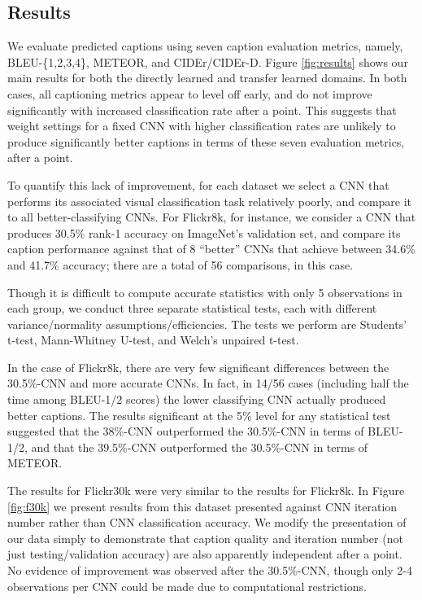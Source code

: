 \documentclass[11pt]{article}
\begin{document}
\subsection{Results}

We evaluate predicted captions using seven caption evaluation metrics,
namely, BLEU-\{1,2,3,4\}, METEOR, and CIDEr/CIDEr-D. Figure
\ref{fig:results} shows our main results for both the directly learned
and transfer learned domains. In both cases, all captioning metrics
appear to level off early, and do not improve significantly with
increased classification rate after a point. This suggests that weight
settings for a fixed CNN with higher classification rates are unlikely
to produce significantly better captions in terms of these seven
evaluation metrics, after a point.

To quantify this lack of improvement, for each dataset we select a CNN
that performs its associated visual classification task relatively
poorly, and compare it to all better-classifying CNNs. For Flickr8k,
for instance, we consider a CNN that produces 30.5\% rank-1 accuracy on
ImageNet's validation set, and compare its caption performance against
that of 8 ``better'' CNNs that achieve between 34.6\% and 41.7\%
accuracy; there are a total of 56 comparisons, in this case.

Though it is difficult to compute accurate statistics with only 5
observations in each group, we conduct three separate statistical
tests, each with different variance/normality
assumptions/efficiencies. The tests we perform are Students' t-test,
Mann-Whitney U-test, and Welch's unpaired t-test.

In the case of Flickr8k, there are very few significant differences
between the 30.5\%-CNN and more accurate CNNs. In fact, in 14/56 cases
(including half the time among BLEU-1/2 scores) the lower classifying
CNN actually produced better captions. The results significant at the
5\% level for any statistical test suggested that the 38\%-CNN
outperformed the 30.5\%-CNN in terms of BLEU-1/2, and that the
39.5\%-CNN outperformed the 30.5\%-CNN in terms of METEOR.

The results for Flickr30k were very similar to the results for
Flickr8k. In Figure \ref{fig:f30k} we present results from this
dataset presented against CNN iteration number rather than CNN
classification accuracy. We modify the presentation of our data simply
to demonstrate that caption quality and iteration number (not just
testing/validation accuracy) are also apparently independent after a
point. No evidence of improvement was observed after the 30.5\%-CNN,
though only 2-4 observations per CNN could be made due to
computational restrictions.
\end{document}
